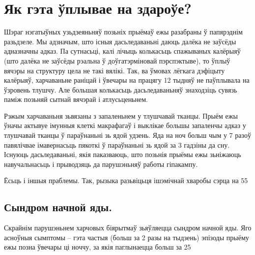 \section{Як гэта ўплывае на здароўе?}

Шэраг нэгатыўных узьдзеяньняў позьніх прыёмаў ежы разабраны ў папярэднім разьдзеле. Мы адзначым, што існыя дасьледаваньні даюць далёка не заўсёды адназначны адказ. Па сутнасьці, калі лічыць колькасьць спажываных калёрыяў (што далёка не заўсёды рэальна ў доўгатэрміновай пэрспэктыве), то ўплыў вячэры на структуру цела не такі вялікі. Так, ва ўмовах лёгкага дэфіцыту калёрыяў, харчаваньне раніцай і ўвечары на працягу 12 тыдняў не паўплывала на ўзровень тлушчу. Але большая колькасьць дасьледаваньняў знаходзіць сувязь паміж позьняй сытнай вячэрай і атлусьценьнем.

Рэжым харчаваньня зьвязаны з запаленьнем у тлушчавай тканцы. Прыём ежы ўначы актывуе імунныя клеткі макрафагаў і выклікае большы запаленчы адказ у тлушчавай тканцы ў параўнаньні зь ядой удзень. Яда на ноч больш чым у 7 разоў павялічвае імавернасьць пякоткі ў параўнаньні зь ядой за 3 гадзіны да сну. Існуюць дасьледаваньні, якія паказваюць, што позьнія прыёмы ежы зьніжаюць навучальнасьць і прыводзяць да парушэньняў работы гіпакампу.

Ёсьць і іншыя праблемы. Так, рызыка разьвіцьця ішэмічнай хваробы сэрца на 55%

\subsection{Сындром начной яды.}
Скрайнім парушэньнем харчовых біярытмаў зьяўляецца сындром начной яды. Яго асноўныя сымптомы – гэта частыя (больш за 2 разы на тыдзень) эпізоды прыёму ежы позна ўвечары ці ноччу, за якія паглынаецца больш за 25%

